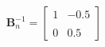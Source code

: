 \documentclass[preview]{standalone}
\begin{document}
\begin{align*}
\mathbf{B}_n^{-1} = \begin{bmatrix} 1 & -0.5 \\ \\0 &  0.5 \end{bmatrix}
\end{align*}
\end{document}
